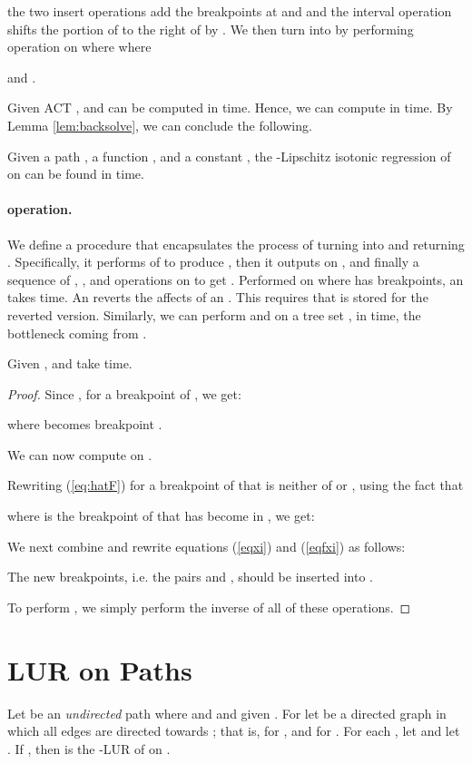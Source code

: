 \documentclass[11pt]{article}
\begin{document}
the two insert operations add the breakpoints at  and  and the interval operation shifts the portion of  to the right of  by .
We then turn  into  by performing  operation on  where  where 
 
and 
.




Given ACT ,  and  can be computed in  time.  Hence, we can compute  in  time.  By Lemma \ref{lem:backsolve}, we can conclude the following.

\begin{theorem}
Given a path , a function , and a constant , the -Lipschitz isotonic regression of  on  can be found in  time.
\end{theorem}



\paragraph{ operation.}
We define a procedure  that encapsulates the process of turning  into  and returning .  
Specifically, it performs  of  to produce , then it outputs  on , and finally a sequence of , , 
and  operations on  to 
get .  
Performed on  where  has  breakpoints, an  takes  time.  
An  reverts the affects of an .  This requires that  is stored for the reverted version.  
Similarly, we can perform  and  on a tree set , in  time, the bottleneck coming from .


\begin{lemma}\label{lem:tree-update}
Given ,  and  take  time.
\end{lemma}
\begin{proof}Since , for a breakpoint  of , we get:

where  becomes breakpoint .

We can now compute  on .

Rewriting (\ref{eq:hatF}) for a breakpoint  of  that is neither of  or , using the fact that 

where  is the breakpoint of  that has become  in , we get:

We next combine and rewrite equations (\ref{eqxi}) and (\ref{eqfxi}) as follows:


The new breakpoints, i.e. the pairs  and , should be inserted into . 

To perform , we simply perform the inverse of all of these operations.  
\end{proof}



\section{LUR on Paths} \label{sec:pathlur}
Let  be an {\em undirected} path where  and  and given . For  let  be a directed graph in which all edges are directed 
towards ; that is, for ,  and for  .  
For each , let  and let .  
If , then  is the -LUR of  on .
\end{document}
